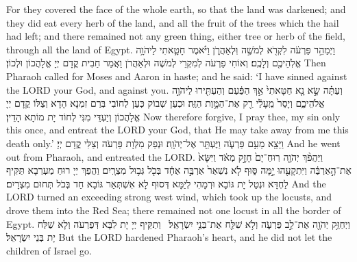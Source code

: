 {{For they covered the face of the whole earth, so that the land was darkened; and they did eat every herb of the land, and all the fruit of the trees which the hail had left; and there remained not any green thing, either tree or herb of the field, through all the land of Egypt.}{}
{וַיְמַהֵ֣ר פַּרְעֹ֔ה לִקְרֹ֖א לְמֹשֶׁ֣ה וּֽלְאַהֲרֹ֑ן וַיֹּ֗אמֶר חָטָ֛אתִי לַיהֹוָ֥ה אֱלֹֽהֵיכֶ֖ם וְלָכֶֽם׃}
{וְאוֹחִי פַרְעֹה לְמִקְרֵי לְמֹשֶׁה וּלְאַהֲרֹן וַאֲמַר חַבִית קֳדָם יְיָ אֱלָהֲכוֹן וּלְכוֹן׃}
{Then Pharaoh called for Moses and Aaron in haste; and he said: ‘I have sinned against the LORD your God, and against you.}{}
{וְעַתָּ֗ה שָׂ֣א נָ֤א חַטָּאתִי֙ אַ֣ךְ הַפַּ֔עַם וְהַעְתִּ֖ירוּ לַיהֹוָ֣ה אֱלֹהֵיכֶ֑ם וְיָסֵר֙ מֵֽעָלַ֔י רַ֖ק אֶת־הַמָּ֥וֶת הַזֶּֽה׃}
{וּכְעַן שְׁבוֹק כְּעַן לְחוֹבִי בְּרַם זִמְנָא הָדָא וְצַלּוֹ קֳדָם יְיָ אֱלָהֲכוֹן וְיַעְדֵּי מִנִּי לְחוֹד יָת מוֹתָא הָדֵין׃}
{Now therefore forgive, I pray thee, my sin only this once, and entreat the LORD your God, that He may take away from me this death only.’}{}
{וַיֵּצֵ֖א מֵעִ֣ם פַּרְעֹ֑ה וַיֶּעְתַּ֖ר אֶל־יְהֹוָֽה׃}
{וּנְפַק מִלְּוָת פַּרְעֹה וְצַלִּי קֳדָם יְיָ׃}
{And he went out from Pharaoh, and entreated the LORD.}{}
{וַיַּהֲפֹ֨ךְ יְהֹוָ֤ה רֽוּחַ־יָם֙ חָזָ֣ק מְאֹ֔ד וַיִּשָּׂא֙ אֶת־הָ֣אַרְבֶּ֔ה וַיִּתְקָעֵ֖הוּ יָ֣מָּה סּ֑וּף לֹ֤א נִשְׁאַר֙ אַרְבֶּ֣ה אֶחָ֔ד בְּכֹ֖ל גְּב֥וּל מִצְרָֽיִם׃
}
{וַהֲפַךְ יְיָ רוּחַ מַעְרְבָא תַּקִּיף לַחְדָּא וּנְטַל יָת גּוֹבָא וּרְמָהִי לְיַמָּא דְּסוּף לָא אִשְׁתְּאַר גּוֹבָא חַד בְּכֹל תְּחוּם מִצְרָיִם׃}
{And the LORD turned an exceeding strong west wind, which took up the locusts, and drove them into the Red Sea; there remained not one locust in all the border of Egypt.}{}
{וַיְחַזֵּ֥ק יְהֹוָ֖ה אֶת־לֵ֣ב פַּרְעֹ֑ה וְלֹ֥א שִׁלַּ֖ח אֶת־בְּנֵ֥י יִשְׂרָאֵֽל׃ \petucha }
{וְתַקֵּיף יְיָ יָת לִבָּא דְּפַרְעֹה וְלָא שַׁלַּח יָת בְּנֵי יִשְׂרָאֵל׃}
{But the LORD hardened Pharaoh’s heart, and he did not let the children of Israel go.}{}
}
